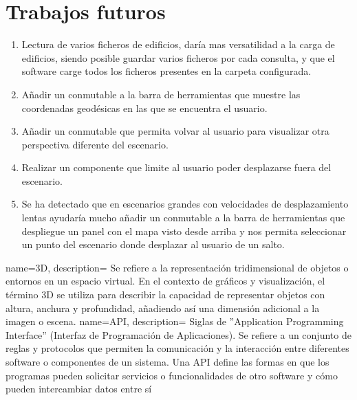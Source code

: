 \documentclass[a4paper, 11pt]{book}
\begin{document}
\section{Trabajos futuros}
\begin{enumerate}
    \item Lectura de varios ficheros de edificios, daría mas versatilidad a la carga de edificios, siendo posible guardar varios ficheros por cada consulta, y que el software carge todos los ficheros presentes en la carpeta configurada.
    \item Añadir un conmutable a la barra de herramientas que muestre las coordenadas geodésicas en las que se encuentra el usuario.
    \item Añadir un conmutable que permita volvar al usuario para visualizar otra perspectiva diferente del escenario.
    \item Realizar un componente que limite al usuario poder desplazarse fuera del escenario.
    \item Se ha detectado que en escenarios grandes con velocidades de desplazamiento lentas ayudaría mucho añadir un conmutable a la barra de herramientas que despliegue un panel con el mapa visto desde arriba y nos permita seleccionar un punto del escenario donde desplazar al usuario de un salto.
\end{enumerate}
\label{sec:trabajos_futuros}
\nocite{*}


{
    name=3D,
    description={
    Se refiere a la representación tridimensional de objetos o entornos en un espacio virtual. En el contexto de gráficos y visualización, el término 3D se utiliza para describir la capacidad de representar objetos con altura, anchura y profundidad, añadiendo así una dimensión adicional a la imagen o escena.
    }
}
{
    name=API,
    description={
    Siglas de ''Application Programming Interface'' (Interfaz de Programación de Aplicaciones). Se refiere a un conjunto de reglas y protocolos que permiten la comunicación y la interacción entre diferentes software o componentes de un sistema. Una API define las formas en que los programas pueden solicitar servicios o funcionalidades de otro software y cómo pueden intercambiar datos entre sí
    }
}
\end{document}
